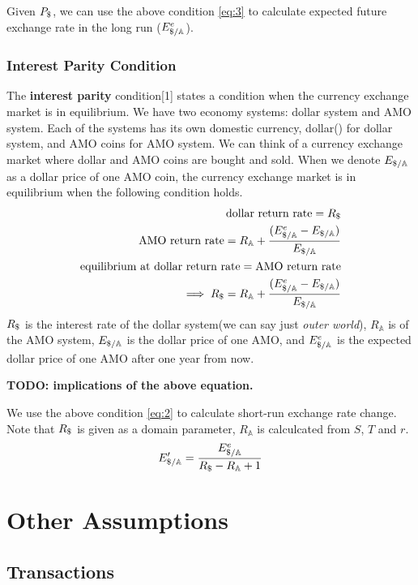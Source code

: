 \documentclass[a4paper,11pt]{scrartcl}
\newcommand{\dd}{\text{\textdollar}}
\newcommand{\amom}{\mathbb{A}}
\begin{document}
Given $P_\dd$, we can use the above condition \eqref{eq:3} to calculate
expected future exchange rate in the long run ($E^e_{\dd/\amom}$).

\subsubsection{Interest Parity Condition}
The \textbf{interest parity} condition[1] states a condition when the currency
exchange market is in equilibrium. We have two economy systems: dollar system
and AMO system. Each of the systems has its own domestic currency, dollar(\dd)
for dollar system, and AMO coins for AMO system. We can think of a currency
exchange market where dollar and AMO coins are bought and sold. When we denote
$E_{\dd/\amom}$ as a dollar price of one AMO coin, the currency exchange market
is in equilibrium when the following condition holds.
\begin{eqnarray}
	\text{dollar return rate} = R_\dd \\
	\text{AMO return rate} = R_\amom + \frac{(E^e_{\dd/\amom} - E_{\dd/\amom})}
	{E_{\dd/\amom}} \\
	\text{equilibrium at\ } \text{dollar return rate} = \text{AMO return rate} \\
	\implies R_\dd = R_\amom + \frac{(E^e_{\dd/\amom} - E_{\dd/\amom})}
	{E_{\dd/\amom}} \label{eq:2}
\end{eqnarray}
$R_\dd$ is the interest rate of the dollar system(we can say just
\emph{outer world}), $R_\amom$ is of the AMO system, $E_{\dd/\amom}$ is the
dollar price of one AMO, and $E^e_{\dd/\amom}$ is the expected dollar price of
one AMO after one year from now.

\textbf{TODO: implications of the above equation.}

We use the above condition \eqref{eq:2} to calculate short-run exchange rate
change. Note that $R_\dd$ is given as a domain parameter, $R_\amom$ is
calculcated from $S$, $T$ and $r$.
\begin{equation}
	E'_{\dd/\amom} = \frac{E^e_{\dd/\amom}}{R_\dd - R_\amom + 1}
\end{equation}

\section{Other Assumptions}

\subsection{Transactions}
\end{document}
